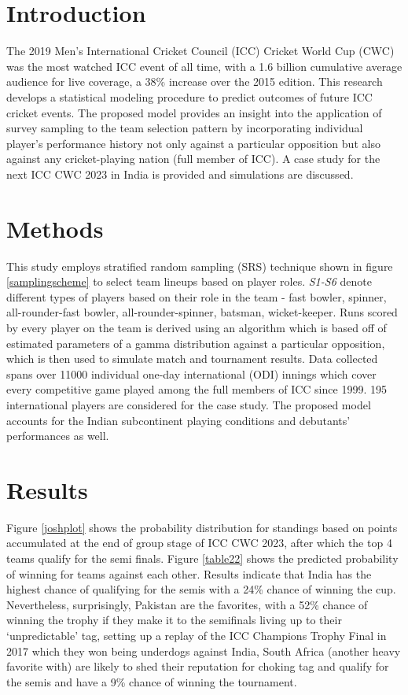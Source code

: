 \documentclass[paper=a4, 12pt, twoside]{article}
\begin{document}
	\section*{Introduction}\label{intro}
		The 2019 Men’s International Cricket Council (ICC) Cricket World Cup (CWC) was the most watched ICC event of all time, with a 1.6 billion cumulative average audience for
		live coverage, a 38\% increase over the 2015 edition. This research develops a statistical
		modeling procedure to predict outcomes of future ICC cricket events. The proposed
		model provides an insight into the application of survey sampling to the team selection
		pattern by incorporating individual player’s performance history not only against a
		particular opposition but also against any cricket-playing nation (full member of ICC).
		A case study for the next ICC CWC 2023 in India is provided and simulations are
		discussed.  
	\section*{Methods}\label{method}
		This study employs stratified random sampling  (SRS) technique shown in figure \ref{samplingscheme} to select team lineups based on player roles. \textit{S1-S6} denote different types of players based on their role in the team - fast bowler, spinner, all-rounder-fast bowler, all-rounder-spinner, batsman, wicket-keeper. Runs scored by every player on the team is derived using an algorithm which is based off of estimated parameters of a gamma distribution against a particular opposition, which is then used to simulate match and tournament results. Data collected spans over 11000 individual one-day international (ODI) innings which cover every competitive game played among the full members of ICC since 1999. 195 international players are considered for the case study. The proposed model accounts for the Indian subcontinent playing conditions and debutants' performances as well. 
			\section*{Results}\label{results}
		Figure \ref{joshplot} shows the probability distribution for standings based on points accumulated at the end of group stage of ICC CWC 2023, after which the top 4 teams qualify for the semi finals. Figure \ref{table22} shows the predicted probability of winning for teams against each other. Results indicate that India has the highest chance of qualifying for the semis with a 24\% chance of winning the cup. Nevertheless, surprisingly,  Pakistan are the favorites,  with a 52\% chance of winning the trophy if they make it to the semifinals living up to their `unpredictable' tag, setting up a replay of the ICC Champions Trophy Final in 2017 which they won being underdogs against India, South Africa (another  heavy favorite with) are likely to shed their reputation for choking tag and qualify for the semis and have a 9\% chance of winning the tournament.   
\end{document}
